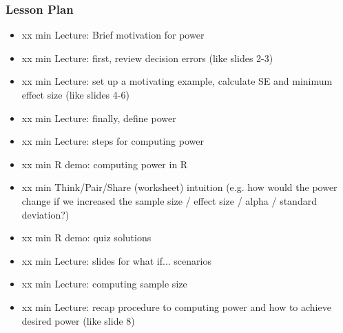 \begin{frame}
    \frametitle{Lesson Plan}
    \begin{itemize}
        \item xx min Lecture: Brief motivation for power
        \item xx min Lecture: first, review decision errors (like slides 2-3)
        \item xx min Lecture: set up a motivating example, calculate SE and minimum effect size (like slides 4-6)
        \item xx min Lecture: finally, define power
        \item xx min Lecture: steps for computing power
        \item xx min R demo: computing power in R
        \item xx min Think/Pair/Share (worksheet) intuition (e.g. how would the power change if we increased the sample size / effect size / alpha / standard deviation?)
        \item xx min R demo: quiz solutions
        \item xx min Lecture: slides for what if... scenarios
        \item xx min Lecture: computing sample size
        \item xx min Lecture: recap procedure to computing power and how to achieve desired power (like slide 8)
    \end{itemize}
\end{frame}

